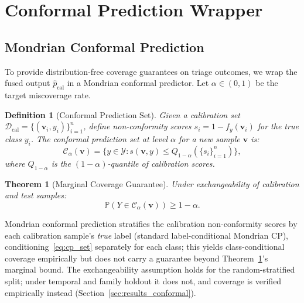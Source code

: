 \documentclass[journal]{IEEEtran}
\newcommand{\Prob}{\mathbb{P}}
\newtheorem{definition}{Definition}
\newtheorem{theorem}{Theorem}
\begin{document}
\section{Conformal Prediction Wrapper}\label{sec:conformal}

\subsection{Mondrian Conformal Prediction}

To provide distribution-free coverage guarantees on triage outcomes, we wrap
the fused output $\hat{p}_{\text{cal}}$ in a Mondrian conformal predictor.
Let $\alpha \in (0,1)$ be the target miscoverage rate.

\begin{definition}[Conformal Prediction Set]\label{def:cp}
Given a calibration set $\mathcal{D}_{\text{cal}} = \{(\mathbf{v}_i,
y_i)\}_{i=1}^{n}$, define non-conformity scores $s_i =
1 - f_y(\mathbf{v}_i)$ for the true class $y_i$. The conformal prediction
set at level $\alpha$ for a new sample $\mathbf{v}$ is:
\begin{equation}\label{eq:cp_set}
  \mathcal{C}_\alpha(\mathbf{v}) = \bigl\{y \in \mathcal{Y} :
    s(\mathbf{v}, y) \leq Q_{1-\alpha}(\{s_i\}_{i=1}^n)\bigr\},
\end{equation}
where $Q_{1-\alpha}$ is the $(1-\alpha)$-quantile of calibration scores.
\end{definition}

\begin{theorem}[Marginal Coverage Guarantee]\label{thm:coverage}
Under exchangeability of calibration and test samples:
\begin{equation}\label{eq:coverage}
  \Prob\!\left(Y \in \mathcal{C}_\alpha(\mathbf{v})\right) \geq 1 - \alpha.
\end{equation}
\end{theorem}

Mondrian conformal prediction stratifies the calibration non-conformity
scores by each calibration sample's \emph{true} label (standard
label-conditional Mondrian CP), conditioning~\eqref{eq:cp_set} separately
for each class; this yields class-conditional coverage empirically but
does not carry a guarantee beyond Theorem~\ref{thm:coverage}'s marginal
bound. The exchangeability assumption holds for the random-stratified
split; under temporal and family holdout it does not, and coverage is
verified empirically instead (Section~\ref{sec:results_conformal}).
\end{document}
